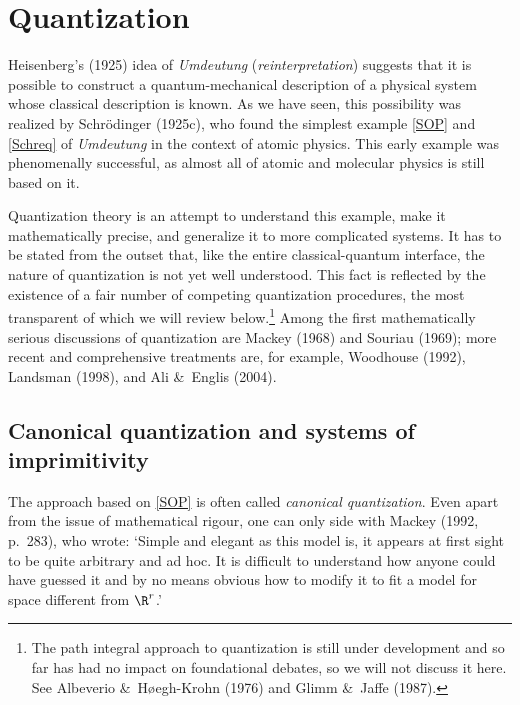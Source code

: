 \documentclass[12pt,titlepage]{article}
\newcommand{\er}{\eqref}
\begin{document}
\section{Quantization}\label{S4}\setcounter{equation}{0}
Heisenberg's (1925) idea of {\it Umdeutung} ({\it reinterpretation}) suggests that it is possible to construct a quantum-mechanical description of a physical system whose classical description is known. As we have seen, this possibility was realized by Schr\"{o}dinger (1925c), who found the simplest example \er{SOP} and \er{Schreq} of {\it Umdeutung} in the context of atomic physics. This early example was phenomenally successful, as almost all of atomic and molecular physics is still based on it. 

Quantization theory is an attempt to understand this example, make it mathematically precise, and generalize it to more complicated systems. It has to be stated from the outset that, like the entire classical-quantum interface, the nature of quantization is not yet well understood. This fact is reflected by the existence of a fair number of competing quantization procedures,  the most transparent of which we will review below.\footnote{The path integral approach to quantization is still under development and so far has had no impact on foundational debates, so  we will not discuss it here.
See  Albeverio \&\ H\o egh-Krohn (1976) and Glimm \&\ Jaffe (1987).} Among  the first mathematically serious discussions of quantization are Mackey (1968) and  Souriau (1969); more recent and comprehensive treatments are, for example, Woodhouse (1992), Landsman (1998),  and Ali \&\ Englis (2004).
\subsection{Canonical quantization and systems of imprimitivity}\label{Mackey}
The approach based on \er{SOP} is often called {\it canonical quantization}. Even apart from the issue of mathematical rigour, one can only side with Mackey (1992, p.\ 283), who wrote: `Simple and elegant as this model is, it appears at first sight to be quite arbitrary and ad hoc. It is difficult to understand how anyone could have guessed it and by no means obvious how to modify it to fit a model for space different from $\R^r$.' 
\end{document}
